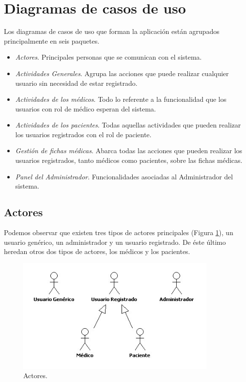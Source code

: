 \documentclass[a4paper,oneside,11pt]{book}
\begin{document}
	
	\section{Diagramas de casos de uso} %
	\label{sub:diagramas_de_casos_de_uso}
	
		Los diagramas de casos de uso que forman la aplicación están agrupados principalmente en seis paquetes.
		\begin{itemize}
			\item \textit{Actores}. Principales personas que se comunican con el sistema.
			\item \textit{Actividades Generales}. Agrupa las acciones que puede realizar cualquier usuario sin necesidad de estar registrado.
			\item \textit{Actividades de los médicos}. Todo lo referente a la funcionalidad que los usuarios con rol de médico esperan del sistema.
			\item \textit{Actividades de los pacientes}. Todas aquellas actividades que pueden realizar los usuarios registrados con el rol de paciente.
			\item \textit{Gestión de fichas médicas}. Abarca todas las acciones que pueden realizar los usuarios registrados, tanto médicos como pacientes, sobre las fichas médicas.
			\item \textit{Panel del Administrador}. Funcionalidades asociadas al Administrador del sistema.
		\end{itemize}
	
	
		\subsection{Actores} %
		\label{sec:actores}
			Podemos observar que existen tres tipos de actores principales (Figura \ref{fig:actores}), un usuario genérico, un administrador y un usuario registrado. De éste último heredan otros dos tipos de actores, los médicos y los pacientes.
			\begin{figure}[H]
			  \centering
			    \includegraphics[width=10cm]{img/jpg/casos_uso/Actores.jpg}
			  \caption{Actores.}
			  \label{fig:actores}
			\end{figure}
			
\end{document}
